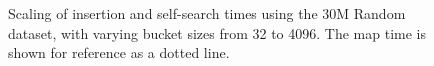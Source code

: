 \begin{landscape}
    \begin{figure}[H]
        \caption{Scaling of insertion and self-search times using the 30M Random
        dataset, with varying bucket sizes from 32 to 4096. The {\keyword map} time
        is shown for reference as a dotted line.}
        \label{fig:seq_30m}
    \end{figure}
\end{landscape}



